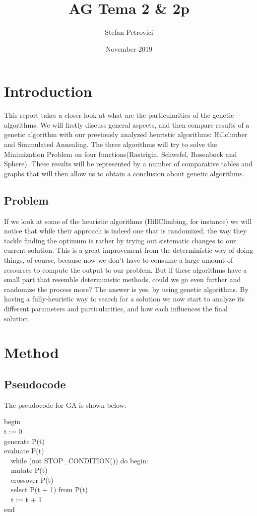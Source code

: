 \documentclass{article}
\title{AG Tema 2 \& 2p}
\author{Stefan Petrovici}
\date{November 2019}
\begin{document}
\maketitle

\section{Introduction}
This report takes a closer look at what are the particularities of the genetic algorithms. We will firstly discuss general aspects, and then compare results of a genetic algorithm with our previously analyzed heuristic algorithms: Hillclimber and Simmulated Annealing. The three algorithms will try to solve the Minimization Problem on four functions(Rastrigin, Schwefel, Rosenbock and Sphere). These results will be represented by a number of comparative tables and graphs that will then allow us to obtain a conclusion about genetic algorithms.

\subsection{Problem}
If we look at some of the heuristic algorithms (HillClimbing, for instance) we will notice that while their approach is indeed one that is randomized, the way they tackle finding the optimum is rather by trying out sistematic changes to our current solution. This is a great improvement from the deterministic way of doing things, of course, because now we don't have to consume a large amount of resources to compute the output to our problem. But if these algorithms have a small part that resemble deterministic methods, could we go even further and randomize the process more? The answer is yes, by using genetic algorithms. By having a fully-heuristic way to search for a solution we now start to analyze its different parameters and particularities, and how each influences the final solution.

\clearpage

\section{Method}
\subsection{Pseudocode}

The pseudocode for GA is shown below:

\begin{tcolorbox}
begin\\
t := 0\\
generate P(t)\\
evaluate P(t)\\
\ \ while (not STOP\_CONDITION()) do begin: \\
\ \ mutate P(t)\\
\ \ crossover P(t)\\
\ \ select P(t + 1) from P(t)\\
\ \ t := t + 1\\
end
\end{tcolorbox}
\end{document}

